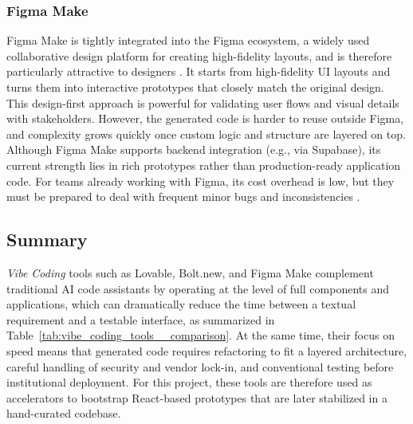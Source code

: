         \subsubsection*{Figma Make}
            {
                    Figma Make is tightly integrated into the Figma ecosystem, a widely used collaborative design platform for creating high-fidelity  layouts,
                    and is therefore particularly attractive to designers \cite{figma}.
                    It starts from high-fidelity UI layouts and turns them into interactive prototypes that closely match the original design.
                    This design-first approach is powerful for validating user flows and visual details with stakeholders. 
                    However, the generated code is harder to reuse outside Figma, and complexity grows quickly once custom logic and structure are layered on top.
                    Although Figma Make supports backend integration (e.g., via Supabase), its current strength lies in rich prototypes rather than production-ready application code.
                    For teams already working with Figma, its cost overhead is low, but they must be prepared  to deal with frequent minor bugs and inconsistencies \cite{medioum-choosing-ai-tools}.
            }

        \subsection*{Summary}
            {
                \textit{Vibe Coding} tools such as Lovable, Bolt.new, and Figma Make complement traditional AI code assistants by operating at the level of full components
                and applications, which can dramatically reduce the time between a textual requirement and a testable interface, as summarized in Table~\ref{tab:vibe_coding_tools__comparison}. 
                At the same time, their focus on speed means that generated code requires refactoring to fit a layered architecture, careful handling of security
                and vendor lock-in, and conventional testing before institutional deployment. 
                For this project, these tools are therefore used as accelerators to bootstrap React-based prototypes that are later stabilized in a hand-curated codebase.  
            }

